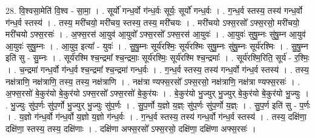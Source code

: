 \documentclass[17pt]{extarticle}
\begin{document}
28. वि॒श्वसा॒मेति॑ वि॒श्व - सा॒मा॒ । . सूर्यो॑ गन्ध॒र्वो ग॑न्ध॒र्वः सूर्यः॒ सूर्यो॑ गन्ध॒र्वः । . ग॒न्ध॒र्व स्तस्य॒ तस्य॑ गन्ध॒र्वो ग॑न्ध॒र्व स्तस्य॑ । . तस्य॒ मरी॑चयो॒ मरी॑चय॒ स्तस्य॒ तस्य॒ मरी॑चयः । . मरी॑चयो ऽफ्स॒रसो᳚ ऽफ्स॒रसो॒ मरी॑चयो॒ मरी॑चयो ऽफ्स॒रसः॑ । . अ॒फ्स॒रस॑ आ॒युव॑ आ॒युवो᳚ ऽफ्स॒रसो᳚ ऽफ्स॒रस॑ आ॒युवः॑ । . आ॒युवः॑ सुषु॒म्नः सु॑षु॒म्न आ॒युव॑ आ॒युवः॑ सुषु॒म्नः । . आ॒युव॒ इत्या᳚ - युवः॑ । . सु॒षु॒म्नः सूर्य॑रश्मिः॒ सूर्य॑रश्मिः सुषु॒म्नः सु॑षु॒म्नः सूर्य॑रश्मिः । . सु॒षु॒म्न इति॑ सु - सु॒म्नः । . सूर्य॑रश्मि श्च॒न्द्रमा᳚ श्च॒न्द्रमाः॒ सूर्य॑रश्मिः॒ सूर्य॑रश्मि श्च॒न्द्रमाः᳚ । . सूर्य॑रश्मि॒रिति॒ सूर्य॑ - र॒श्मिः॒ । . च॒न्द्रमा॑ गन्ध॒र्वो ग॑न्ध॒र्व श्च॒न्द्रमा᳚ श्च॒न्द्रमा॑ गन्ध॒र्वः । . ग॒न्ध॒र्व स्तस्य॒ तस्य॑ गन्ध॒र्वो ग॑न्ध॒र्व स्तस्य॑ । . तस्य॒ नक्ष॑त्राणि॒ नक्ष॑त्राणि॒ तस्य॒ तस्य॒ नक्ष॑त्राणि । . नक्ष॑त्रा ण्यफ्स॒रसो᳚ ऽफ्स॒रसो॒ नक्ष॑त्राणि॒ नक्ष॑त्रा ण्यफ्स॒रसः॑ । . अ॒फ्स॒रसो॑ बे॒कुर॑यो बे॒कुर॑यो ऽफ्स॒रसो᳚ ऽफ्स॒रसो॑ बे॒कुर॑यः । . बे॒कुर॑यो भु॒ज्युर् भु॒ज्युर् बे॒कुर॑यो बे॒कुर॑यो भु॒ज्युः । . भु॒ज्युः सु॑प॒र्णः सु॑प॒र्णो भु॒ज्युर् भु॒ज्युः सु॑प॒र्णः । . सु॒प॒र्णो य॒ज्ञो य॒ज्ञ्ः सु॑प॒र्णः सु॑प॒र्णो य॒ज्ञ्ः । . सु॒प॒र्ण इति॑ सु - प॒र्णः । . य॒ज्ञो ग॑न्ध॒र्वो ग॑न्ध॒र्वो य॒ज्ञो य॒ज्ञो ग॑न्ध॒र्वः । . ग॒न्ध॒र्व स्तस्य॒ तस्य॑ गन्ध॒र्वो ग॑न्ध॒र्व स्तस्य॑ । . तस्य॒ दक्षि॑णा॒ दक्षि॑णा॒ स्तस्य॒ तस्य॒ दक्षि॑णाः । . दक्षि॑णा अफ्स॒रसो᳚ ऽफ्स॒रसो॒ दक्षि॑णा॒ दक्षि॑णा अफ्स॒रसः॑ । \newline
\end{document}
